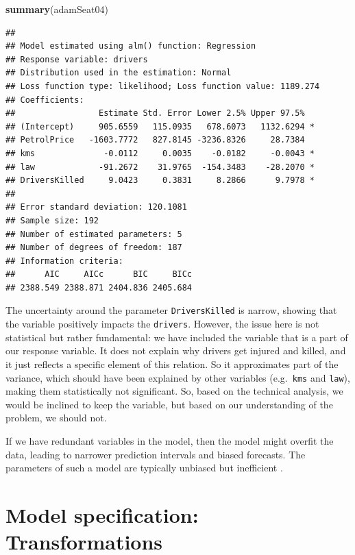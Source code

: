 \documentclass[]{book}
\newenvironment{Shaded}{\begin{snugshade}}{\end{snugshade}}
\newcommand{\KeywordTok}[1]{\textcolor[rgb]{0.13,0.29,0.53}{\textbf{#1}}}
\newcommand{\NormalTok}[1]{#1}
\theoremstyle{definition}
\theoremstyle{definition}
\theoremstyle{definition}
\theoremstyle{definition}
\theoremstyle{remark}
\begin{document}
\begin{Shaded}
\begin{Highlighting}[]
\KeywordTok{summary}\NormalTok{(adamSeat04)}
\end{Highlighting}
\end{Shaded}

\begin{verbatim}
## 
## Model estimated using alm() function: Regression
## Response variable: drivers
## Distribution used in the estimation: Normal
## Loss function type: likelihood; Loss function value: 1189.274
## Coefficients:
##                 Estimate Std. Error Lower 2.5% Upper 97.5%  
## (Intercept)     905.6559   115.0935   678.6073   1132.6294 *
## PetrolPrice   -1603.7772   827.8145 -3236.8326     28.7384  
## kms              -0.0112     0.0035    -0.0182     -0.0043 *
## law             -91.2672    31.9765  -154.3483    -28.2070 *
## DriversKilled     9.0423     0.3831     8.2866      9.7978 *
## 
## Error standard deviation: 120.1081
## Sample size: 192
## Number of estimated parameters: 5
## Number of degrees of freedom: 187
## Information criteria:
##      AIC     AICc      BIC     BICc 
## 2388.549 2388.871 2404.836 2405.684
\end{verbatim}

The uncertainty around the parameter \texttt{DriversKilled} is narrow, showing that the variable positively impacts the \texttt{drivers}. However, the issue here is not statistical but rather fundamental: we have included the variable that is a part of our response variable. It does not explain why drivers get injured and killed, and it just reflects a specific element of this relation. So it approximates part of the variance, which should have been explained by other variables (e.g.~\texttt{kms} and \texttt{law}), making them statistically not significant. So, based on the technical analysis, we would be inclined to keep the variable, but based on our understanding of the problem, we should not.

If we have redundant variables in the model, then the model might overfit the data, leading to narrower prediction intervals and biased forecasts. The parameters of such a model are typically unbiased but inefficient \citep[Section 4.3 of][]{SvetunkovSBA}.

\hypertarget{diagnosticsTransformations}{%
\section{Model specification: Transformations}\label{diagnosticsTransformations}}
\end{document}
